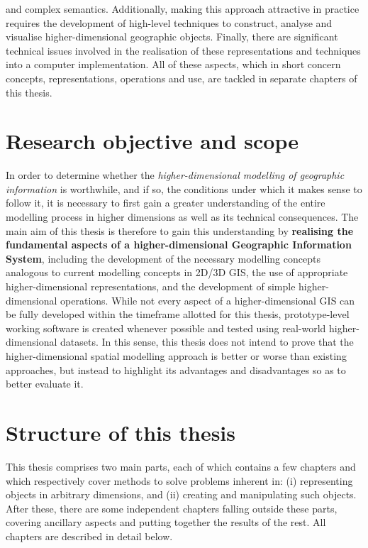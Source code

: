 and complex semantics.
Additionally, making this approach attractive in practice requires the development of high-level techniques to construct, analyse and visualise higher-dimensional geographic objects.
Finally, there are significant technical issues involved in the realisation of these representations and techniques into a computer implementation.
All of these aspects, which in short concern concepts, representations, operations and use, are tackled in separate chapters of this thesis.

\section{Research objective and scope}
\label{se:objective}

In order to determine whether the \emph{higher-dimensional modelling of geographic information} is worthwhile, and if so, the conditions under which it makes sense to follow it, it is necessary to first gain a greater understanding of the entire modelling process in higher dimensions as well as its technical consequences.
The main aim of this thesis is therefore to gain this understanding by \textbf{realising the fundamental aspects of a higher-dimensional Geographic Information System}, including the development of the necessary modelling concepts analogous to current modelling concepts in 2D/3D GIS, the use of appropriate higher-dimensional representations, and the development of simple higher-dimensional operations.
While not every aspect of a higher-dimensional GIS can be fully developed within the timeframe allotted for this thesis, prototype-level working software is created whenever possible and tested using real-world higher-dimensional datasets.
In this sense, this thesis does not intend to prove that the higher-dimensional spatial modelling approach is better or worse than existing approaches, but instead to highlight its advantages and disadvantages so as to better evaluate it.

\section{Structure of this thesis}
\label{se:about}

This thesis comprises two main parts, each of which contains a few chapters and which respectively cover methods to solve problems inherent in: (i) representing objects in arbitrary dimensions, and (ii) creating and manipulating such objects.
After these, there are some independent chapters falling outside these parts, covering ancillary aspects and putting together the results of the rest.
All chapters are described in detail below.

